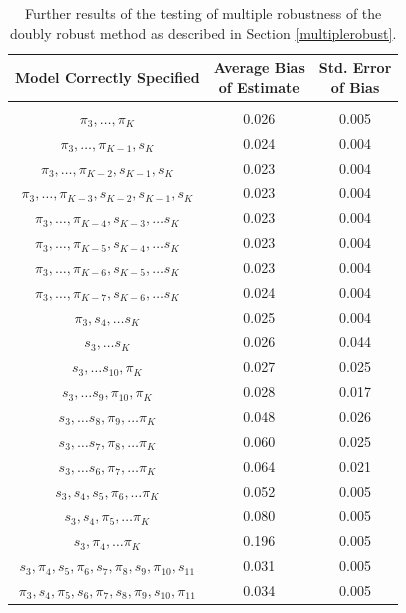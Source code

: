 \begin{table}[h!]
\centering
\begin{tabular} {c | c  c}
Model Correctly Specified & \shortstack{Average Bias \\ of Estimate}  & \shortstack{Std. Error \\of Bias} \\ 
\hline  \\
$\pi_3, \dots, \pi_K$ & 0.026 & 0.005   \\ 
$\pi_3, \dots, \pi_{K-1}, s_K$ & 0.024 & 0.004\\ 
$\pi_3, \dots, \pi_{K-2}, s_{K-1}, s_K$ & 0.023 & 0.004\\ 
$\pi_3, \dots, \pi_{K-3}, s_{K-2} , s_{K-1}, s_K$ & 0.023  &0.004 \\ 
$\pi_3, \dots, \pi_{K-4}, s_{K-3}, \dots s_K $ & 0.023&0.004 \\ 
$\pi_3, \dots, \pi_{K-5}, s_{K-4}, \dots s_K $ &  0.023 &0.004\\ 
$\pi_3, \dots, \pi_{K-6}, s_{K-5}, \dots s_K $ &  0.023 & 0.004 \\ 
$\pi_3, \dots, \pi_{K-7}, s_{K-6}, \dots s_K $ &  0.024 & 0.004\\ 
$\pi_3, s_{4}, \dots s_K $ &  0.025& 0.004 \\ 
$s_3, \dots s_K$ & 0.026 & 0.044 \\ 
$s_3, \dots s_{10}, \pi_K$ & 0.027 & 0.025 \\
$s_3, \dots s_9, \pi_{10}, \pi_K$ &  0.028 & 0.017 \\ 
$s_3, \dots s_8, \pi_9, \dots \pi_K$ & 0.048 &0.026   \\ 
$s_3, \dots s_7, \pi_8, \dots \pi_K$ &  0.060 &  0.025   \\ 
$s_3, \dots s_6, \pi_7, \dots \pi_K$ & 0.064 &0.021 \\ 
$s_3, s_4, s_5, \pi_6, \dots \pi_K$ & 0.052 & 0.005  \\ 
$s_3, s_4, \pi_5, \dots \pi_K$ & 0.080 & 0.005 \\ 
$s_3, \pi_4, \dots \pi_K$ &  0.196 & 0.005 \\ 
$s_3, \pi_4, s_5, \pi_6, s_7, \pi_8, s_9, \pi_{10}, s_{11}$ & 0.031& 0.005 \\ 
$\pi_3, s_4, \pi_5, s_6, \pi_7, s_8, \pi_9, s_{10}, \pi_{11}$ & 0.034 & 0.005
\end{tabular} \\
\centering
\caption[Testing multiple robustness]{Further results of the testing of multiple robustness of the doubly robust method as described in Section \ref{multiplerobust}.}
\label{MultipleTable}
\end{table}
